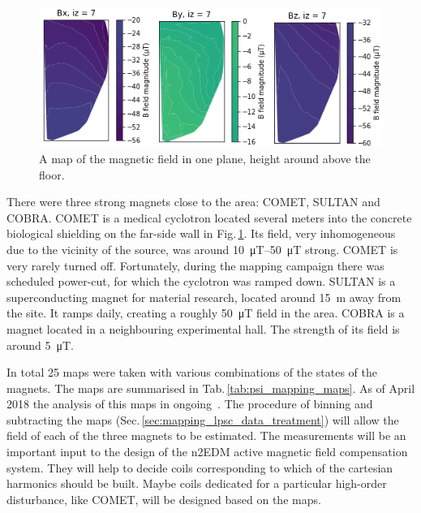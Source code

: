 \begin{figure}
  \centering
  \includegraphics[width=\linewidth]{gfx/mapping/nSnCobCom.png}
  \caption{A map of the magnetic field in one plane, height around  above the floor. }\label{fig:mapping_photo}
\end{figure}

There were three strong magnets close to the area: COMET, SULTAN and COBRA\@. COMET is a medical cyclotron located several meters into the concrete biological shielding on the far-side wall in Fig.\,\ref{fig:mapping_photo}. Its field, very inhomogeneous due to the vicinity of the source, was around \SIrange[range-phrase=--,range-units=single]{10}{50}{\micro\tesla} strong. COMET is very rarely turned off. Fortunately, during the mapping campaign there was scheduled power-cut, for which the cyclotron was ramped down. SULTAN is a superconducting magnet for material research, located around \SI{15}{\metre} away from the site. It ramps daily, creating a roughly \SI{50}{\micro\tesla} field in the area. COBRA is a magnet located in a neighbouring experimental hall. The strength of its field is around \SI{5}{\micro\tesla}.

In total 25 maps were taken with various combinations of the states of the magnets. The maps are summarised in Tab.\,\ref{tab:psi_mapping_maps}.
As of April 2018 the analysis of this maps in ongoing~\cite{EmmeneggerThesis}.
The procedure of binning and subtracting the maps (Sec.\,\ref{sec:mapping_lpsc_data_treatment}) will allow the field of each of the three magnets to be estimated. The measurements will be an important input to the design of the n2EDM active magnetic field compensation system. They will help to decide coils corresponding to which of the cartesian harmonics should be built. Maybe coils dedicated for a particular high-order disturbance, like COMET, will be designed based on the maps. 

